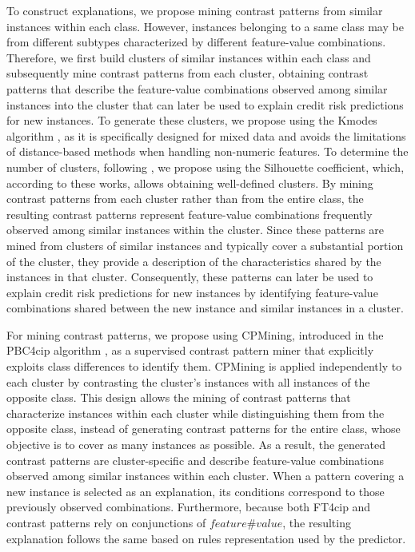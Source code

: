 To construct explanations, we propose mining contrast patterns from similar instances within each class. However, instances belonging to a same class may be from different subtypes  characterized by different feature-value combinations. Therefore, we first build clusters of similar instances within each class and subsequently mine contrast patterns from each cluster, obtaining contrast patterns that describe the feature-value combinations observed among similar instances into the cluster that can later be used to explain credit risk predictions for new instances. To generate these clusters, we propose using the Kmodes algorithm \cite{huang1997clustering, huang1998extensions}, as it is specifically designed for mixed data and avoids the limitations of distance-based methods when handling non-numeric features. To determine the number of clusters, following \cite{dinh2019estimating, kuswardana2025comparison}, we propose using the Silhouette coefficient, which, according to these works, allows obtaining well-defined clusters. {\color{blue}By mining contrast patterns from each cluster rather than from the entire class, the resulting contrast patterns represent feature-value combinations frequently observed among similar instances within the cluster. Since these patterns are mined from clusters of similar instances and typically cover a substantial portion of the cluster, they provide a description of the characteristics shared by the instances in that cluster. Consequently, these patterns can later be used to explain credit risk predictions for new instances by identifying feature-value combinations shared between the new instance and similar instances in a cluster.}\newline 

For mining contrast patterns, we propose using CPMining, introduced in the PBC4cip algorithm \cite{loyola2017pbc4cip}, as a supervised contrast pattern miner that explicitly exploits class differences to identify them. CPMining is applied independently to each cluster by contrasting the cluster's instances with all instances of the opposite class. This design allows the mining of contrast patterns that characterize instances within each cluster while distinguishing them from the opposite class, instead of generating contrast patterns for the entire class, whose objective is to cover as many instances as possible. {\color{blue} As a result, the generated contrast patterns are cluster-specific and describe feature-value combinations observed among similar instances within each cluster. When a pattern covering a new instance is selected as an explanation, its conditions correspond to those previously observed combinations. Furthermore, because both FT4cip and contrast patterns rely on conjunctions of $feature\#value$, the resulting explanation follows the same based on rules representation used by the predictor.}\newline

